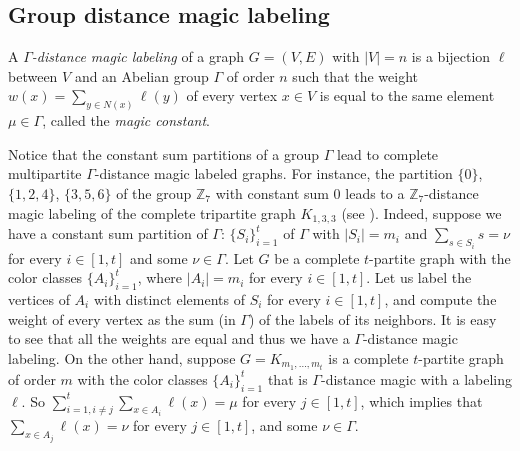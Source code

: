 \documentclass{article}
\newcommand{\zet}{\mathbb{Z}}
\begin{document}
 

\subsection{Group distance magic labeling}\label{subsec:gdm}

A $\Gamma$\emph{-distance magic labeling} of a graph $G = (V, E)$ with $|V| = n$ is a bijection $\ell$ between $V$ and  an Abelian group $\Gamma$ of order $n$
such that the weight $w(x) =\sum_{y\in N(x)}\ell(y)$ of every vertex $x \in V$ is equal to the same element $\mu\in \Gamma$, called the \emph{magic
constant}.

Notice that the constant sum partitions of a group $\Gamma$ lead to complete multipartite $\Gamma$-distance magic labeled graphs. For
instance, the partition $\{0\}$, $\{1, 2, 4\}$, $\{3, 5, 6\}$ of the group $\zet_7$ with constant sum $0$ leads to a $\zet_7$-distance magic labeling
of the complete tripartite graph $K_{1,3,3}$ (see \cite{CicZ}). Indeed, suppose we have a constant sum partition of $\Gamma$: $\{S_i\}_{i=1}^t$ of $\Gamma$ with $|S_i| = m_i$ and $\sum_{s\in S_i}s = \nu$ for every {$i\in[1,t]$} and some $\nu \in \Gamma$. Let $G$ be a complete $t$-partite graph with the color classes $\{A_i\}_{i=1}^t$, where $|A_i|=m_i$ for every  {$i\in[1 ,t]$}. Let us label the vertices of $A_i$ with distinct elements of $S_i$ for every {$i\in[1 ,t]$}, and compute the weight of every vertex as the sum (in $\Gamma$) of the labels of its neighbors. It is easy to see that all the weights are equal and thus we have a $\Gamma$-distance magic labeling. On the other hand, suppose $G=K_{m_1,\ldots,m_t}$ is a complete $t$-partite graph of order $m$ with the color classes $\{A_i\}_{i=1}^t$ that is $\Gamma$-distance magic  {with a labeling $\ell$}. So $\sum_{i=1,i\neq j}^t\sum_{x\in A_i}\ell(x) = \mu$ for every {$j\in[1 , t]$}, which implies that $\sum_{x\in A_j}\ell(x) = \nu$ for every  {$j\in[1 , t]$}, and some $\nu\in\Gamma$. 
\end{document}
